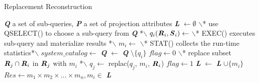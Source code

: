     \begin{algorithm}[htb]
        \caption{Replacement Reconstruction}
        \begin{algorithmic}[1]
            \Require \textbf{\textit{Q}} a set of sub-queries, \textbf{\textit{P}} a set of projection attributes
                \State \textbf{\textit{L}} $\gets \emptyset$
                    \State $\backslash$* use QSELECT() to choose a sub-query from \textbf{\textit{Q}} *$\backslash$
                    \State $q_i(\textbf{\textit{R}}_i,\textbf{\textit{S}}_i) \gets$ 
                    \State $\backslash$* EXEC() executes sub-query and materialize results *$\backslash$
                    \State $m_i \gets$ 
                    \State $\backslash$* STAT() collects the run-time statistics*$\backslash$
                    \State $system\_catalog \gets$ 
                    \State \textbf{\textit{Q}} $\gets$ \textbf{\textit{Q}} $\setminus \{q_i\}$
                    \State $flag \gets 0$
                            \State $\backslash$* replace subset $\textbf{\textit{R}}_j \cap \textbf{\textit{R}}_i$ in $\textbf{\textit{R}}_j$ with $m_i$ *$\backslash$
                            \State $q_j \gets$ replac($q_j$, $m_i$, $\textbf{\textit{R}}_i$)
                            \State $flag \gets 1$
                        \EndIf
                    \EndFor
                        \State \textbf{\textit{L}} $\gets$ \textbf{\textit{L}} $\cup \{m_i\}$
                    \EndIf
                \EndWhile
                \State $Res \gets m_1 \times m_2 \times ... \times m_n, m_i \in$ \textbf{\textit{L}}
                \State {}
            \EndFunction
        \end{algorithmic}
    \end{algorithm}
